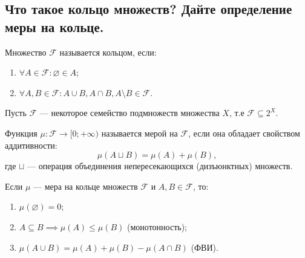 
\subsection{Что такое кольцо множеств? Дайте определение меры на кольце.}
    
    \begin{definition}[Маевский]
        Множество $\mathcal{F}$ называется кольцом, если:\\[-25 pt]
        \begin{enumerate}
            \item $\forall A \in \mathcal{F} : \varnothing \in A$;
            \item $\forall A,  B \in \mathcal{F} : A \cup B, A \cap B, A \setminus B \in \mathcal{F}$.
        \end{enumerate}
    \end{definition}

    \begin{definition}
        Пусть $\mathcal{F}$ --- некоторое семейство подмножеств множества $X$, 
        т.е $\mathcal{F} \subseteq 2^X$.
        
        Функция $\mu : \mathcal{F} \to [0; +\infty)$ называется мерой на $\mathcal{F}$, 
        если она обладает свойством аддитивности:
        \[ \mu(A \sqcup B) = \mu(A) + \mu(B), \]
        где $\sqcup$ --- операция объединения непересекающихся (дизъюнктных) множеств.
    \end{definition}
        
    \begin{properties}
        Если $\mu$ --- мера на кольце множеств $\mathcal{F}$ и $A, B \in \mathcal{F}$, то:\\[-25 pt]
        \begin{enumerate}
            \item $\mu(\varnothing) = 0$;
            \item $A \subseteq B \implies \mu(A) \le \mu(B)$ (монотонность);
            \item $\mu(A \cup B) = \mu(A) + \mu(B) - \mu(A \cap B)$ (ФВИ).
        \end{enumerate}
    \end{properties}
